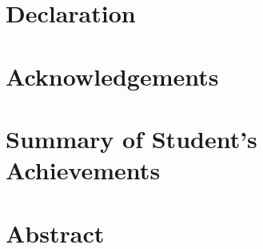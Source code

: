\documentclass[12pt]{article}
\begin{document}
\pagestyle{plain} %


\restoregeometry


\section*{Declaration}

\pagebreak

\section*{Acknowledgements}

\pagebreak

\section*{Summary of Student's Achievements}

\pagebreak

\setcounter{tocdepth}{5}
\tableofcontents
\pagebreak

\listoffigures
\listoftables
\pagebreak

\setlength{\glsdescwidth}{0.55\linewidth} %
\renewcommand{\glsnamefont}[1]{\textbf{#1}} %
\renewcommand*{\glspostdescription}{} %

\printglossary[type=\acronymtype]
\setcounter{table}{0} %
\pagebreak

\justify

\section*{Abstract}

\pagebreak

\pagestyle{fancy} %

\fancyhf{} %
\fancyhead[R]{\thepage} %
\fancyhead[L]{\leftmark} %
\renewcommand{\headrulewidth}{0.1pt} %
\renewcommand{\footrulewidth}{0pt} %
\end{document}
